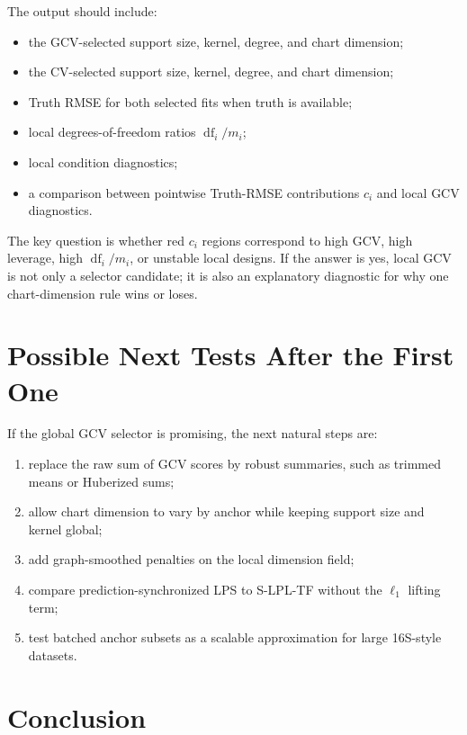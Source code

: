 \documentclass[11pt]{article}
\newcommand{\df}{\operatorname{df}}
\begin{document}
The output should include:

\begin{itemize}[leftmargin=*]
  \item the GCV-selected support size, kernel, degree, and chart dimension;
  \item the CV-selected support size, kernel, degree, and chart dimension;
  \item Truth RMSE for both selected fits when truth is available;
  \item local degrees-of-freedom ratios \(\df_i/m_i\);
  \item local condition diagnostics;
  \item a comparison between pointwise Truth-RMSE contributions \(c_i\) and
  local GCV diagnostics.
\end{itemize}

The key question is whether red \(c_i\) regions correspond to high GCV, high
leverage, high \(\df_i/m_i\), or unstable local designs.
If the answer is yes, local GCV is not only a selector candidate; it is also an
explanatory diagnostic for why one chart-dimension rule wins or loses.

\section{Possible Next Tests After the First One}

If the global GCV selector is promising, the next natural steps are:

\begin{enumerate}[leftmargin=*]
  \item replace the raw sum of GCV scores by robust summaries, such as trimmed
  means or Huberized sums;
  \item allow chart dimension to vary by anchor while keeping support size and
  kernel global;
  \item add graph-smoothed penalties on the local dimension field;
  \item compare prediction-synchronized LPS to S-LPL-TF without the
  \(\ell_1\) lifting term;
  \item test batched anchor subsets as a scalable approximation for large
  16S-style datasets.
\end{enumerate}

\section*{Conclusion}
\end{document}
